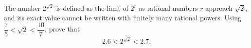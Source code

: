 The number \(2^{\sqrt2}\) is defined as the limit of \(2^{r}\) as rational numbers \(r\) approach \(\sqrt2\), and its exact value cannot be written with finitely many rational powers. Using \(\dfrac{7}{5}<\sqrt2<\dfrac{10}{7}\), prove that
\[
2.6<2^{\sqrt2}<2.7 .
\]

